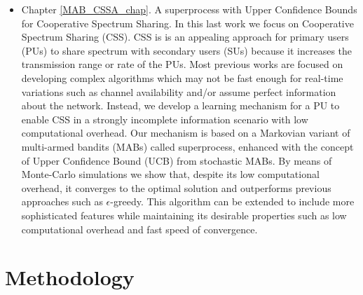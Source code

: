 \begin{itemize}
\item Chapter \ref{MAB_CSSA_chap}. A superprocess with Upper Confidence Bounds for Cooperative Spectrum Sharing. In this last work we focus on Cooperative Spectrum Sharing (CSS). CSS is is an appealing approach for primary users (PUs) to share spectrum with secondary users (SUs) because it increases the transmission range or rate of the PUs. Most previous works are focused on developing complex algorithms which may not be fast enough for real-time variations such as channel availability and/or assume perfect information about the network. Instead, we develop a learning mechanism for a PU to enable CSS in a strongly incomplete information scenario with low computational overhead. Our mechanism is based on a Markovian variant of multi-armed bandits (MABs) called superprocess, enhanced with the concept of Upper Confidence Bound (UCB) from stochastic MABs. By means of Monte-Carlo simulations we show that, despite its low computational overhead, it converges to the optimal solution and outperforms previous approaches such as $\epsilon$-greedy. This algorithm can be extended to include more sophisticated features while maintaining its desirable properties such as low computational overhead and fast speed of convergence. 
\end{itemize}

\section{Methodology}

